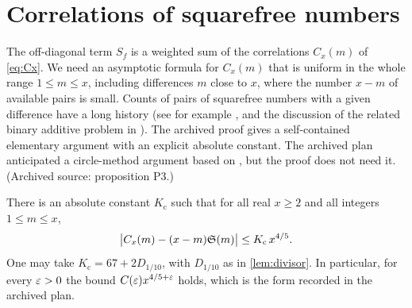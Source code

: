 \chapter{Correlations of squarefree numbers}\label{ch:correlations}

The off-diagonal term $S_f$ is a weighted sum of the correlations $C_x(m)$ of \eqref{eq:Cx}. We need an asymptotic formula for $C_x(m)$ that is uniform in the whole range $1\le m\le x$, including differences $m$ close to $x$, where the number $x-m$ of available pairs is small. Counts of pairs of squarefree numbers with a given difference have a long history (see for example \cite{mirsky1949}, and the discussion of the related binary additive problem in \cite[\S1]{bgpvw1998}). The archived proof gives a self-contained elementary argument with an explicit absolute constant. The archived plan anticipated a circle-method argument based on \cite{bgpvw1998}, but the proof does not need it. (Archived source: proposition P3.)

\begin{proposition}\label{prop:corr}
There is an absolute constant $K_{\mathrm c}$ such that for all real $x\ge2$ and all integers $1\le m\le x$,
\[
\bigl|C_x(m)-(x-m)\mathfrak S(m)\bigr|\le K_{\mathrm c}\,x^{4/5}.
\]
One may take $K_{\mathrm c}=67+2D_{1/10}$, with $D_{1/10}$ as in \cref{lem:divisor}. In particular, for every $\varepsilon>0$ the bound $C(\varepsilon)x^{4/5+\varepsilon}$ holds, which is the form recorded in the archived plan.
\end{proposition}

